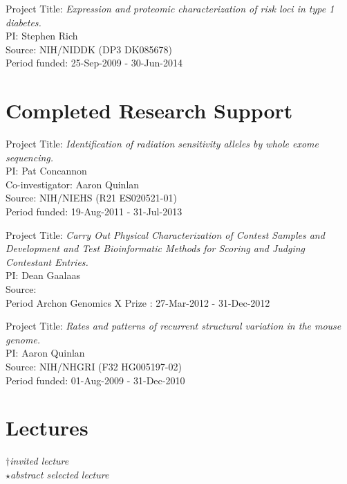 \documentclass[margin,line]{cv}
\begin{document}
\begin{resume}
    \vspace{-2mm}
    Project Title: \textit{Expression and proteomic characterization of risk loci in type 1 diabetes.} \\
    PI: Stephen Rich \\
    Source: NIH/NIDDK (DP3 DK085678)\\
    Period funded: 25-Sep-2009 - 30-Jun-2014


    \section{\mysidestyle Completed Research Support}

    Project Title: \textit{Identification of radiation sensitivity alleles by whole exome sequencing.} \\
    PI: Pat Concannon \\
    Co-investigator: Aaron Quinlan \\
    Source: NIH/NIEHS (R21 ES020521-01) \\
    Period funded: 19-Aug-2011 - 31-Jul-2013
    
    \vspace{-2mm}
    Project Title: \textit{Carry Out Physical Characterization of Contest Samples and Development and Test Bioinformatic Methods for Scoring and Judging Contestant Entries.}\\
    PI: Dean Gaalaas\\
    Source: \\
    Period Archon Genomics X Prize : 27-Mar-2012 - 31-Dec-2012

    \vspace{-2mm}
    Project Title: \textit{Rates and patterns of recurrent structural variation in the mouse genome.}\\
    PI: Aaron Quinlan\\
    Source: NIH/NHGRI (F32 HG005197-02)\\
    Period funded: 01-Aug-2009 - 31-Dec-2010

    \section{\mysidestyle Lectures}

    $\dagger$\textit{invited lecture}\\
    $\star$\textit{abstract selected lecture}


\end{resume}
\end{document}

